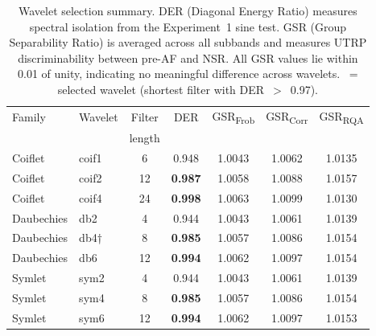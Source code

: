\begin{table}[htbp]
\centering
\caption{Wavelet selection summary. DER (Diagonal Energy Ratio) measures spectral isolation from the Experiment~1 sine test. GSR (Group Separability Ratio) is averaged across all subbands and measures UTRP discriminability between pre-AF and NSR. All GSR values lie within 0.01 of unity, indicating no meaningful difference across wavelets. \dag~= selected wavelet (shortest filter with DER~$>$~0.97).}
\label{tab:wavelet_selection}
\begin{tabular}{llccccc}
\toprule
Family & Wavelet & Filter & DER & GSR\textsubscript{Frob} & GSR\textsubscript{Corr} & GSR\textsubscript{RQA} \\
& & length & & & & \\
\midrule
Coiflet & coif1 & 6 & 0.948 & 1.0043 & 1.0062 & 1.0135 \\
Coiflet & coif2 & 12 & \textbf{0.987} & 1.0058 & 1.0088 & 1.0157 \\
Coiflet & coif4 & 24 & \textbf{0.998} & 1.0063 & 1.0099 & 1.0130 \\
\midrule
Daubechies & db2 & 4 & 0.944 & 1.0043 & 1.0061 & 1.0139 \\
\rowcolor{blue!12} Daubechies & db4† & 8 & \textbf{0.985} & 1.0057 & 1.0086 & 1.0154 \\
Daubechies & db6 & 12 & \textbf{0.994} & 1.0062 & 1.0097 & 1.0154 \\
\midrule
Symlet & sym2 & 4 & 0.944 & 1.0043 & 1.0061 & 1.0139 \\
Symlet & sym4 & 8 & \textbf{0.985} & 1.0057 & 1.0086 & 1.0154 \\
Symlet & sym6 & 12 & \textbf{0.994} & 1.0062 & 1.0097 & 1.0153 \\
\bottomrule
\end{tabular}
\end{table}